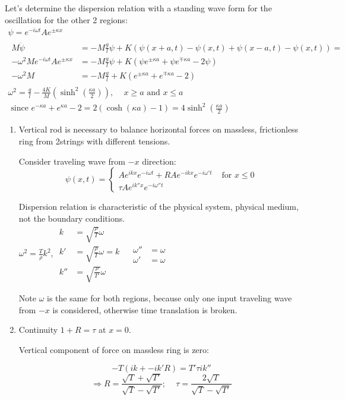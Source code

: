 \documentclass[twoside,10pt]{amsart}
\newcommand{\problemhead}[1]
  {\smallskip
   \noindent{\large\bf Problem #1.}
   \smallskip}
\begin{document}
Let's determine the dispersion relation with a standing wave form for the oscillation for the other 2 regions:  
\[
\begin{gathered}
  \psi = e^{- i \omega t} Ae^{\pm \kappa x} \\
  \begin{aligned}
    M \ddot{\psi} & = -M \frac{g}{l} \psi + K(\psi(x+a,t) - \psi(x,t) + \psi(x-a,t) - \psi(x,t) ) = \\
    -\omega^2 M e^{-i \omega t}Ae^{ \pm \kappa x} & = -M \frac{g}{l} \psi + K( \psi e^{ \pm \kappa a} + \psi e^{ \mp \kappa a} - 2 \psi ) \\
    -\omega^2 M & = -M \frac{g}{l} + K (e^{ \pm \kappa a} + e^{\mp \kappa a} - 2) 
  \end{aligned} \\
  \boxed{ \omega^2 = \frac{g}{l} - \frac{4 K }{M} (\sinh^2{ \left( \frac{ \kappa a}{2} \right) } ), \quad \, x \geq a \text{ and } x \leq a } \\
  \text{ since } e^{-\kappa a} + e^{\kappa a} - 2 = 2 (\cosh{(\kappa a)} - 1) = 4 \sinh^2{ \left( \frac{ \kappa a}{2} \right) }
\end{gathered}
\]

\problemhead{9.3} \begin{enumerate}
\item Vertical rod is necessary to balance horizontal forces on massless, frictionless ring from 2strings with different tensions.  

Consider traveling wave from $-x$ direction:
\[
\psi(x,t) = \begin{cases} Ae^{ikx} e^{-i \omega t} + RA e^{-ikx} e^{-i\omega' t} & \text{ for } x \leq 0 \\ \tau A e^{ik'' x} e^{-i \omega'' t} \end{cases}
\]

Dispersion relation is characteristic of the physical system, physical medium, not the boundary conditions.   \\
$\omega^2 = \frac{T}{\rho} k^2$, \quad $\begin{aligned} k & = \sqrt{ \frac{\rho}{T} } \omega \\ k' & = \sqrt{ \frac{\rho}{T} } \omega = k \\ k''& = \sqrt{ \frac{ \rho}{ T' } } \omega \end{aligned}$ \quad \, $\begin{aligned} \omega'' & = \omega \\ \omega' & = \omega \end{aligned} $  

Note $\omega$ is the same for both regions, because only one input traveling wave from $-x$ is considered, otherwise time translation is broken.  
\item Continuity $1+R = \tau$ at $x=0$.  

Vertical component of force on massless ring is zero: 

\[
-T ( ik + -ik' R) = T' \tau i k'' 
\]
\[
\Longrightarrow R = \frac{ \sqrt{ T} + \sqrt{ T' } }{ \sqrt{T} - \sqrt{ T' } }; \quad \,  \tau = \frac{ 2 \sqrt{ T}}{ \sqrt{ T} - \sqrt{T' } }
\]
\end{enumerate}
\end{document}
